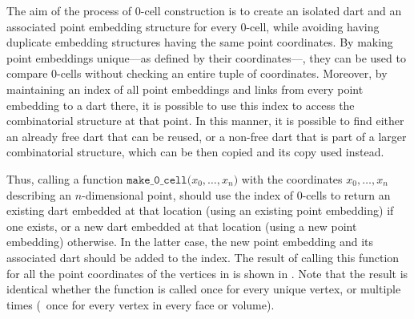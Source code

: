 The aim of the process of 0-cell construction is to create an isolated dart and an associated point embedding structure for every 0-cell, while avoiding having duplicate embedding structures having the same point coordinates.
By making point embeddings unique---as defined by their coordinates---, they can be used to compare 0-cells without checking an entire tuple of coordinates.
Moreover, by maintaining an index of all point embeddings and links from every point embedding to a dart there, it is possible to use this index to access the combinatorial structure at that point.
In this manner, it is possible to find either an already free dart that can be reused, or a non-free dart that is part of a larger combinatorial structure, which can be then copied and its copy used instead.

Thus, calling a function $\texttt{make\_0\_cell(}x_0, \ldots, x_n\texttt{)}$ with the coordinates $x_0, \ldots, x_n$ describing an $n$-dimensional point, should use the index of 0-cells to return an existing dart embedded at that location (using an existing point embedding) if one exists, or a new dart embedded at that location (using a new point embedding) otherwise.
In the latter case, the new point embedding and its associated dart should be added to the index.
The result of calling this function for all the point coordinates of the vertices in  is shown in .
Note that the result is identical whether the function is called once for every unique vertex, or multiple times (\eg\ once for every vertex in every face or volume).

